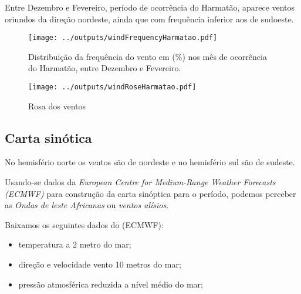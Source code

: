 Entre Dezembro e Fevereiro, período de ocorrência do Harmatão, aparece 
ventos oriundos da direção nordeste, ainda que com frequência inferior 
aos de sudoeste.

\begin{figure}[H]
\begin{center}
  \texttt{[image: ../outputs/windFrequencyHarmatao.pdf]}
\end{center}
\caption{Distribuição da frequência do vento em (\%) nos mês de ocorrência
         do Harmatão, entre Dezembro e Fevereiro.}
\end{figure}

\begin{figure}[H]
\begin{center}
  \texttt{[image: ../outputs/windRoseHarmatao.pdf]}
  \caption{Rosa dos ventos}
\end{center}
\end{figure}

\subsection{Carta sinótica}


No hemisfério norte os ventos são de nordeste e no hemisfério sul são de sudeste. 


Usando-se dados da \textit{European Centre for Medium-Range Weather Forecasts (ECMWF)}
para construção da carta sinóptica para o período, podemos perceber as 
\textit{Ondas de leste Africanas} ou \textit{ventos alísios}.

Baixamos os seguintes dados do (ECMWF):
\begin{itemize}
  \item temperatura a 2 metro do mar;
  \item direção e velocidade vento 10 metros do mar;
  \item pressão atmosférica reduzida a nível médio do mar;
\end{itemize}



